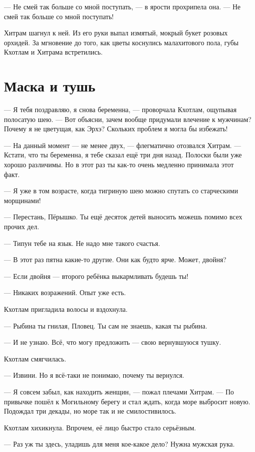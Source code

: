 \documentclass[a4paper,10pt,fleqn]{book}\usepackage{cooltooltips}\usepackage{polyglossia}\setdefaultlanguage{english}\setotherlanguage{russian}\defaultfontfeatures{Ligatures=TeX,Mapping=tex-text} \usepackage{xcolor}\definecolor{lightgray}{HTML}{bbbbbb}\color{lightgray}\newcommand{\ml}[3]{\textcolor{black}{#3}}
\begin{document}
--- Не смей так больше со мной поступать, --- в ярости прохрипела она.
--- Не смей так больше со мной поступать!

Хитрам шагнул к ней.
Из его руки выпал измятый, мокрый букет розовых орхидей.
За мгновение до того, как цветы коснулись малахитового пола, губы Кхотлам и Хитрама встретились.

\chapter{Маска и тушь}

--- Я тебя поздравляю, я снова беременна, --- проворчала Кхотлам, ощупывая полосатую шею.
--- Вот объясни, зачем вообще придумали влечение к мужчинам?
Почему я не цветущая, как Эрхэ?
Скольких проблем я могла бы избежать!

--- На данный момент --- не менее двух, --- флегматично отозвался Хитрам.
--- Кстати, что ты беременна, я тебе сказал ещё три дня назад.
Полоски были уже хорошо различимы.
Но в этот раз ты как-то очень медленно принимала этот факт.

--- Я уже в том возрасте, когда тигриную шею можно спутать со старческими морщинами!

--- Перестань, Пёрышко.
Ты ещё десяток детей выносить можешь помимо всех прочих дел.

--- Типун тебе на язык.
Не надо мне такого счастья.

--- В этот раз пятна какие-то другие.
Они как будто ярче.
Может, двойня?

--- Если двойня --- второго ребёнка выкармливать будешь ты!

--- Никаких возражений.
Опыт уже есть.

Кхотлам пригладила волосы и вздохнула.

--- Рыбина ты гнилая, Пловец.
Ты сам не знаешь, какая ты рыбина.

--- И не узнаю.
Всё, что могу предложить --- свою вернувшуюся тушку.

Кхотлам смягчилась.

--- Извини.
Но я всё-таки не понимаю, почему ты вернулся.

--- Я совсем забыл, как находить женщин, --- пожал плечами Хитрам.
--- По привычке пошёл к Могильному берегу и стал ждать, когда море выбросит новую.
Подождал три декады, но море так и не смилостивилось.

Кхотлам хихикнула.
Впрочем, её лицо быстро стало серьёзным.

--- Раз уж ты здесь, уладишь для меня кое-какое дело?
Нужна мужская рука.
\end{document}
